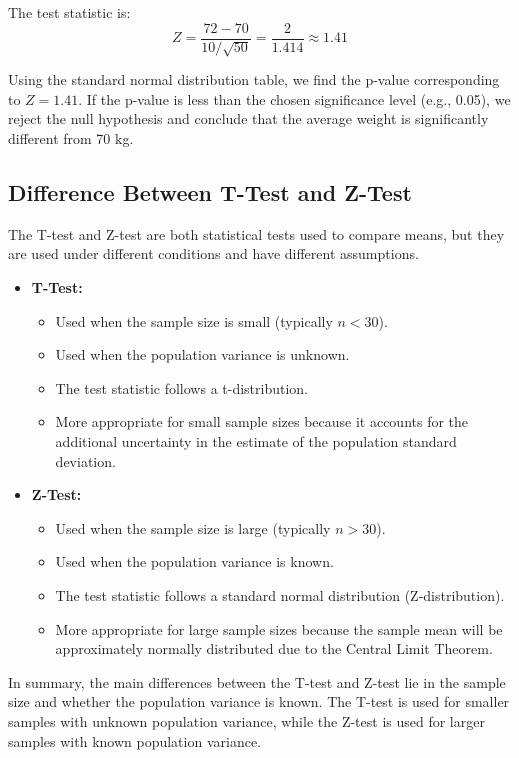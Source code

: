 \documentclass{article}
\begin{document}
The test statistic is:
\[
Z = \frac{72 - 70}{10 / \sqrt{50}} = \frac{2}{1.414} \approx 1.41
\]

Using the standard normal distribution table, we find the p-value corresponding to \(Z = 1.41\). If the p-value is less than the chosen significance level (e.g., 0.05), we reject the null hypothesis and conclude that the average weight is significantly different from 70 kg.

\subsection{Difference Between T-Test and Z-Test}
The T-test and Z-test are both statistical tests used to compare means, but they are used under different conditions and have different assumptions.

\begin{itemize}
    \item \textbf{T-Test:}
    \begin{itemize}
        \item Used when the sample size is small (typically \(n < 30\)).
        \item Used when the population variance is unknown.
        \item The test statistic follows a t-distribution.
        \item More appropriate for small sample sizes because it accounts for the additional uncertainty in the estimate of the population standard deviation.
    \end{itemize}
    
    \item \textbf{Z-Test:}
    \begin{itemize}
        \item Used when the sample size is large (typically \(n > 30\)).
        \item Used when the population variance is known.
        \item The test statistic follows a standard normal distribution (Z-distribution).
        \item More appropriate for large sample sizes because the sample mean will be approximately normally distributed due to the Central Limit Theorem.
    \end{itemize}
\end{itemize}

In summary, the main differences between the T-test and Z-test lie in the sample size and whether the population variance is known. The T-test is used for smaller samples with unknown population variance, while the Z-test is used for larger samples with known population variance.
\end{document}
